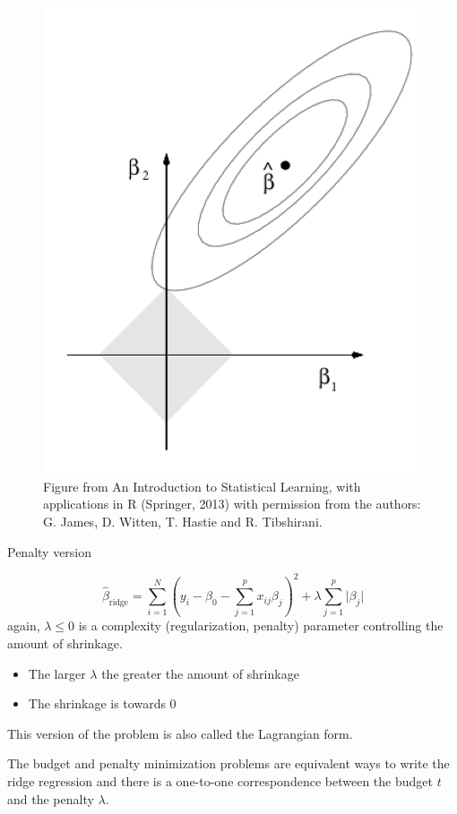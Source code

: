 \documentclass[
  ignorenonframetext,
]{beamer}
\providecommand{\tightlist}{%
  \setlength{\itemsep}{0pt}\setlength{\parskip}{0pt}}
\begin{document}
\begin{frame}

\begin{figure}
\includegraphics[width=0.5\linewidth]{./ILS67lasso} \caption{Figure from An Introduction to Statistical Learning, with applications in R (Springer, 2013) with permission from the authors: G. James, D. Witten, T. Hastie and R. Tibshirani.}\label{fig:unnamed-chunk-11}
\end{figure}

\end{frame}

\begin{frame}

\begin{block}{Penalty version}

\[ \hat{\beta}_{\text{ridge}}= \sum_{i=1}^N (y_i-\beta_0-\sum_{j=1}^p x_{ij}\beta_j )^2 + \lambda \sum_{j=1}^p \lvert \beta_j\rvert \]
again, \(\lambda \le 0\) is a complexity (regularization, penalty)
parameter controlling the amount of shrinkage.

\begin{itemize}
\tightlist
\item
  The larger \(\lambda\) the greater the amount of shrinkage
\item
  The shrinkage is towards 0
\end{itemize}

This version of the problem is also called the Lagrangian form.

The budget and penalty minimization problems are equivalent ways to
write the ridge regression and there is a one-to-one correspondence
between the budget \(t\) and the penalty \(\lambda\).

\end{block}

\end{frame}
\end{document}
